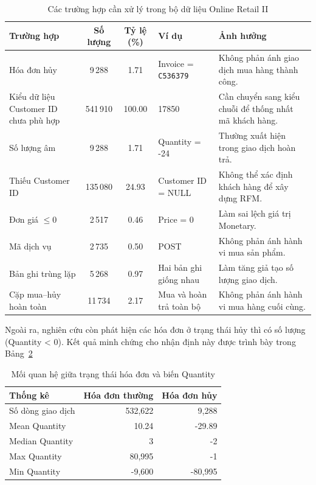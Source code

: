\documentclass[12pt]{ai_conquer2026}
\begin{document}
\begin{table}[H]
\centering
\caption{Các trường hợp cần xử lý trong bộ dữ liệu Online Retail II}
\label{tab:data_issues}
\renewcommand{\arraystretch}{1.3}
\begin{tabular}{p{3.6cm}ccp{3.4cm}p{5.0cm}}
\toprule
\textbf{Trường hợp} &
\textbf{Số lượng} &
\textbf{Tỷ lệ (\%)} &
\textbf{Ví dụ} &
\textbf{Ảnh hưởng} \\
\midrule

Hóa đơn hủy &
9\,288 &
1.71 &
Invoice = \texttt{C536379} &
Không phản ánh giao dịch mua hàng thành công. \\

Kiểu dữ liệu Customer ID chưa phù hợp &
541\,910 &
100.00 &
17850 &
Cần chuyển sang kiểu chuỗi để thống nhất mã khách hàng. \\

Số lượng âm &
9\,288 &
1.71 &
Quantity = -24 &
Thường xuất hiện trong giao dịch hoàn trả. \\

Thiếu Customer ID &
135\,080 &
24.93 &
Customer ID = NULL &
Không thể xác định khách hàng để xây dựng RFM. \\

Đơn giá $\leq 0$ &
2\,517 &
0.46 &
Price = 0 &
Làm sai lệch giá trị Monetary. \\

Mã dịch vụ &
2\,735 &
0.50 &
POST &
Không phản ánh hành vi mua sản phẩm. \\

Bản ghi trùng lặp &
5\,268 &
0.97 &
Hai bản ghi giống nhau &
Làm tăng giả tạo số lượng giao dịch. \\

Cặp mua--hủy hoàn toàn &
11\,734 &
2.17 &
Mua và hoàn trả toàn bộ &
Không phản ánh hành vi mua hàng cuối cùng. \\

\bottomrule
\end{tabular}
\end{table}

Ngoài ra, nghiên cứu còn phát hiện các hóa đơn ở trạng thái hủy thì có số lượng (Quantity < 0). Kết quả minh chứng cho nhận định này được trình bày trong Bảng~\ref{tab:cancel_quantity}

\begin{table}[H]
\centering
\caption{Mối quan hệ giữa trạng thái hóa đơn và biến Quantity}
\label{tab:cancel_quantity}
\renewcommand{\arraystretch}{1.3}
\begin{tabular}{lrr}
\toprule
\textbf{Thống kê} & \textbf{Hóa đơn thường} & \textbf{Hóa đơn hủy} \\
\midrule
Số dòng giao dịch & 532,622 & 9,288 \\
Mean Quantity & 10.24 & -29.89 \\
Median Quantity & 3 & -2 \\
Max Quantity & 80,995 & -1 \\
Min Quantity & -9,600 & -80,995 \\
\bottomrule
\end{tabular}
\end{table}
\end{document}
